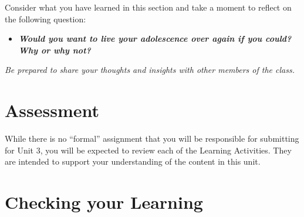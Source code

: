 \documentclass[
]{book}
\providecommand{\tightlist}{%
  \setlength{\itemsep}{0pt}\setlength{\parskip}{0pt}}
\begin{document}
\begin{reflect}
Consider what you have learned in this section and take a moment to reflect on the following question:

\begin{itemize}
\tightlist
\item
  \textbf{\emph{Would you want to live your adolescence over again if you could? Why or why not?}}
\end{itemize}

\emph{Be prepared to share your thoughts and insights with other members of the class.}
\end{reflect}

\hypertarget{assessment-2}{%
\section*{Assessment}\label{assessment-2}}

\begin{assessment}
While there is no ``formal'' assignment that you will be responsible for submitting for Unit 3, you will be expected to review each of the Learning Activities. They are intended to support your understanding of the content in this unit.
\end{assessment}

\hypertarget{checking-your-learning-2}{%
\section*{Checking your Learning}\label{checking-your-learning-2}}
\end{document}
